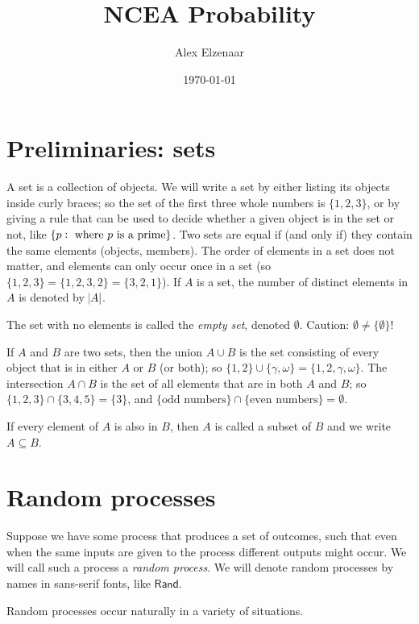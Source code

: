 \documentclass[a4paper,10pt]{article}
\title{NCEA Probability}
\author{Alex Elzenaar}
\date{\today}
\newcommand{\rand}{\mathsf{Rand}}
\theoremstyle{definition}
\begin{document}
\maketitle

\section{Preliminaries: sets}
A set is a collection of objects. We will write a set by either listing its objects inside curly braces; so
the set of the first three whole numbers is $ \{1,2,3\} $, or by giving a rule that can be used to decide
whether a given object is in the set or not, like $ \{ p : \text{ where $ p $ is a prime}\} $. Two sets
are equal if (and only if) they contain the same elements (objects, members). The order of elements in a set does not matter, and
elements can only occur once in a set (so $ \{1,2,3\} = \{1,2,3,2\} = \{3, 2, 1\} $).
If $ A $ is a set, the number of distinct elements in $ A $ is denoted by $ \abs{A} $.

The set with no elements is called the \emph{empty set}, denoted $ \emptyset $. Caution: $ \emptyset \neq \{\emptyset\} $!

If $ A $ and $ B $ are two sets, then the union $ A \cup B $ is the set consisting of every object that is
in either $ A $ or $ B $ (or both); so $ \{1, 2\} \cup \{ \gamma, \omega\} = \{1, 2, \gamma, \omega \} $.
The intersection $ A \cap B $ is the set of all elements that are in both $ A $ and $ B $; so $ \{1,2,3\} \cap \{3,4,5\} = \{3\} $,
and $ \{\text{odd numbers}\} \cap \{\text{even numbers}\} = \emptyset $.

If every element of $ A $ is also in $ B $, then $ A $ is called a subset of $ B $ and we write $ A \subseteq B $.

\section{Random processes}
Suppose we have some process that produces a set of outcomes, such that even when
the same inputs are given to the process different outputs might occur. We will call
such a process a \emph{random process}. We will denote random processes by names
in sans-serif fonts, like $ \rand $.

Random processes occur naturally in a variety of situations.
\end{document}
